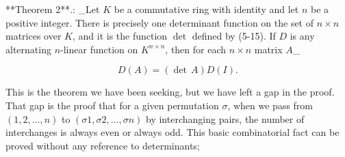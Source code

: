 **Theorem 2**.: _Let \(K\) be a commutative ring with identity and let \(n\) be a positive integer. There is precisely one determinant function on the set of \(n\times n\) matrices over \(K\), and it is the function \(\det\) defined by (5-15). If \(D\) is any alternating \(n\)-linear function on \(K^{n\times n}\), then for each \(n\times n\) matrix \(A\)_

\[D(A)=(\det\,A)D(I).\]

This is the theorem we have been seeking, but we have left a gap in the proof. That gap is the proof that for a given permutation \(\sigma\), when we pass from \((1,2,\ldots,n)\) to \((\sigma 1,\sigma 2,\ldots,\sigma n)\) by interchanging pairs, the number of interchanges is always even or always odd. This basic combinatorial fact can be proved without any reference to determinants; 
